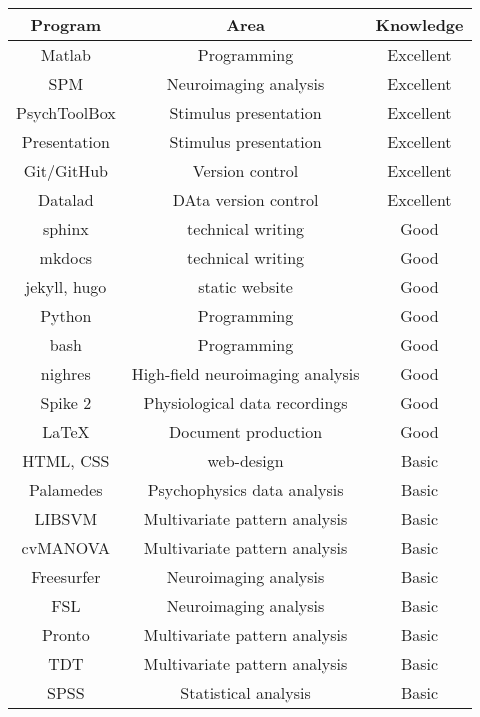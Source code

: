 \begin{center}
\begin{tabular}[c]{|c|c|c|}
\hline\hline
Program         & Area                              & Knowledge \\
\hline
Matlab          & Programming                       & Excellent \\
SPM             & Neuroimaging analysis             & Excellent \\
PsychToolBox    & Stimulus presentation             & Excellent \\
Presentation    & Stimulus presentation             & Excellent \\
Git/GitHub      & Version control                   & Excellent \\
Datalad         & DAta version control              & Excellent \\
sphinx          & technical writing                 & Good \\
mkdocs          & technical writing                 & Good \\
jekyll, hugo    & static website                    & Good \\
Python          & Programming                       & Good \\
bash            & Programming                       & Good \\
nighres         & High-field neuroimaging analysis  & Good \\
Spike 2         & Physiological data recordings     & Good \\
\LaTeX          & Document production               & Good \\
HTML, CSS       & web-design                        & Basic \\
Palamedes       & Psychophysics data analysis       & Basic \\
LIBSVM          & Multivariate pattern analysis     & Basic \\
cvMANOVA        & Multivariate pattern analysis     & Basic \\
Freesurfer      & Neuroimaging analysis             & Basic \\
FSL             & Neuroimaging analysis             & Basic \\
Pronto          & Multivariate pattern analysis     & Basic \\
TDT             & Multivariate pattern analysis     & Basic \\
SPSS            & Statistical analysis              & Basic \\
\hline\hline
\end{tabular}
\end{center}

